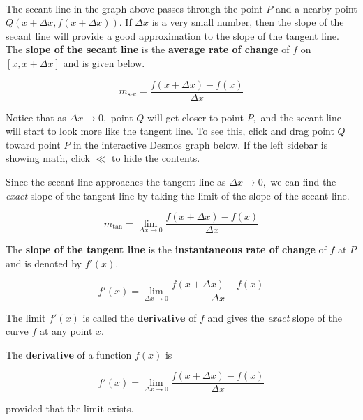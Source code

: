 \documentclass{ximera}
\begin{document}
~ \\[2em]

The secant line in the graph above passes through the point $P$ and a nearby point $Q(x+\Delta x, f(x+\Delta x)).$  If $\Delta x$ is a very small number,
then the slope of the secant line will provide a good approximation to the slope of the tangent line.  The \textbf{slope of the secant line} is the 
\textbf{average rate of change} of $f$ on $[x, x+ \Delta x]$ and is given below.


\[ m_{\sec} = \frac{f(x+\Delta x) - f(x)}{\Delta x}     \]


Notice that as $\Delta x \rightarrow 0,$ point $Q$ will get closer to point $P,$ and the secant line will start to look more like
the tangent line.  To see this, click and drag point $Q$ toward point $P$ in the interactive Desmos graph below.  If the left sidebar 
is showing math, click $\mathbf{\ll}$ to hide the contents.


\begin{center}


\end{center}

Since the secant line approaches the tangent line as $\Delta x \rightarrow 0,$ we can find the \emph{exact} slope of the tangent line by taking the limit
of the slope of the secant line.

\[ m_{\tan} = \lim_{\Delta x \rightarrow 0} \frac{f(x+\Delta x) - f(x)}{\Delta x}  \]

The \textbf{slope of the tangent line} is the \textbf{instantaneous rate of change} of $f$ at $P$ and is denoted by $f'(x).$

\[ f'(x) = \lim_{\Delta x \rightarrow 0} \frac{f(x+\Delta x) - f(x)}{\Delta x}  \]

The limit $f'(x)$ is called the \textbf{derivative} of $f$ and gives the \emph{exact} slope of the curve $f$ at any point $x.$

\begin{theorem}

The \textbf{derivative} of a function $f(x)$ is

\[ f'(x) = \lim_{\Delta x \rightarrow 0} \frac{f(x+\Delta x) - f(x)}{\Delta x} \]

provided that the limit exists.
\end{theorem}
\end{document}
